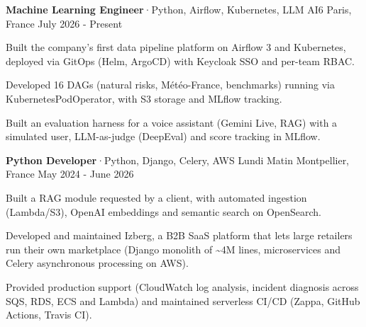 

\begin{cventries}

  \cventry
    {\textbf{Machine Learning Engineer}{\enskip·\enskip}{\fontsize{7.5pt}{1em}\selectfont Python, Airflow, Kubernetes, LLM}} %
    {AI6} %
    {Paris, France} %
    {July 2026 - Present} %
    {
      \begin{cvitems} %
        \item {Built the company’s first data pipeline platform on Airflow 3 and Kubernetes, deployed via GitOps (Helm, ArgoCD) with Keycloak SSO and per-team RBAC.}
        \item {Developed 16 DAGs (natural risks, Météo-France, benchmarks) running via KubernetesPodOperator, with S3 storage and MLflow tracking.}
        \item {Built an evaluation harness for a voice assistant (Gemini Live, RAG) with a simulated user, LLM-as-judge (DeepEval) and score tracking in MLflow.}
      \end{cvitems}
    }


  \cventry
    {\textbf{Python Developer}{\enskip·\enskip}{\fontsize{7.5pt}{1em}\selectfont Python, Django, Celery, AWS}} %
    {Lundi Matin} %
    {Montpellier, France} %
    {May 2024 - June 2026} %
    {
      \begin{cvitems} %
        \item {Built a RAG module requested by a client, with automated ingestion (Lambda/S3), OpenAI embeddings and semantic search on OpenSearch.}
        \item {Developed and maintained Izberg, a B2B SaaS platform that lets large retailers run their own marketplace (Django monolith of \textasciitilde 4M lines, microservices and Celery asynchronous processing on AWS).}
        \item {Provided production support (CloudWatch log analysis, incident diagnosis across SQS, RDS, ECS and Lambda) and maintained serverless CI/CD (Zappa, GitHub Actions, Travis CI).}
      \end{cvitems}
    }



\end{cventries}
